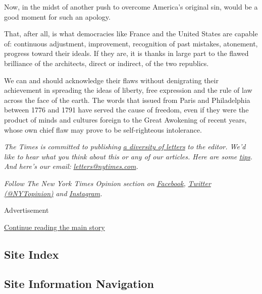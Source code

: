Now, in the midst of another push to overcome America's original sin,
would be a good moment for such an apology.

That, after all, is what democracies like France and the United States
are capable of: continuous adjustment, improvement, recognition of past
mistakes, atonement, progress toward their ideals. If they are, it is
thanks in large part to the flawed brilliance of the architects, direct
or indirect, of the two republics.

We can and should acknowledge their flaws without denigrating their
achievement in spreading the ideas of liberty, free expression and the
rule of law across the face of the earth. The words that issued from
Paris and Philadelphia between 1776 and 1791 have served the cause of
freedom, even if they were the product of minds and cultures foreign to
the Great Awokening of recent years, whose own chief flaw may prove to
be self-righteous intolerance.

\emph{The Times is committed to publishing}
\href{https://www.nytimes.com/2019/01/31/opinion/letters/letters-to-editor-new-york-times-women.html}{\emph{a
diversity of letters}} \emph{to the editor. We'd like to hear what you
think about this or any of our articles. Here are some}
\href{https://help.nytimes.com/hc/en-us/articles/115014925288-How-to-submit-a-letter-to-the-editor}{\emph{tips}}\emph{.
And here's our email:}
\href{mailto:letters@nytimes.com}{\emph{letters@nytimes.com}}\emph{.}

\emph{Follow The New York Times Opinion section on}
\href{https://www.facebook.com/nytopinion}{\emph{Facebook}}\emph{,}
\href{http://twitter.com/NYTOpinion}{\emph{Twitter (@NYTopinion)}}
\emph{and}
\href{https://www.instagram.com/nytopinion/}{\emph{Instagram}}\emph{.}

Advertisement

\protect\hyperlink{after-bottom}{Continue reading the main story}

\hypertarget{site-index}{%
\subsection{Site Index}\label{site-index}}

\hypertarget{site-information-navigation}{%
\subsection{Site Information
Navigation}\label{site-information-navigation}}

